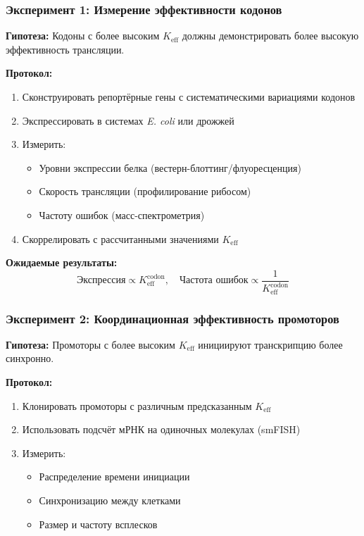 \documentclass[12pt]{article}
\begin{document}
	\subsubsection{Эксперимент 1: Измерение эффективности кодонов}
	\textbf{Гипотеза:} Кодоны с более высоким $K_{\text{eff}}$ должны демонстрировать более высокую эффективность трансляции.
	
	\textbf{Протокол:}
	\begin{enumerate}
		\item Сконструировать репортёрные гены с систематическими вариациями кодонов
		\item Экспрессировать в системах \textit{E. coli} или дрожжей
		\item Измерить:
		\begin{itemize}
			\item Уровни экспрессии белка (вестерн-блоттинг/флуоресценция)
			\item Скорость трансляции (профилирование рибосом)
			\item Частоту ошибок (масс-спектрометрия)
		\end{itemize}
		\item Скоррелировать с рассчитанными значениями $K_{\text{eff}}$
	\end{enumerate}
	
	\textbf{Ожидаемые результаты:}
	\[
	\text{Экспрессия} \propto K_{\text{eff}}^{\text{codon}}, \quad \text{Частота ошибок} \propto \frac{1}{K_{\text{eff}}^{\text{codon}}}
	\]
	
	\subsubsection{Эксперимент 2: Координационная эффективность промоторов}
	\textbf{Гипотеза:} Промоторы с более высоким $K_{\text{eff}}$ инициируют транскрипцию более синхронно.
	
	\textbf{Протокол:}
	\begin{enumerate}
		\item Клонировать промоторы с различным предсказанным $K_{\text{eff}}$
		\item Использовать подсчёт мРНК на одиночных молекулах (smFISH)
		\item Измерить:
		\begin{itemize}
			\item Распределение времени инициации
			\item Синхронизацию между клетками
			\item Размер и частоту всплесков
		\end{itemize}
	\end{enumerate}
	
\end{document}
